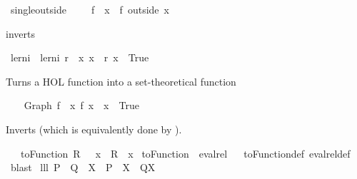 \begin{isabellebody}
\ singleoutside\ {\isacharparenleft}\ {\isachardoublequoteopen}{\isacharminus}{\isacharminus}{\isachardoublequoteclose}\ {}{}{\isacharparenright}\ \ {\isachardoublequoteopen}f\ {\isacharminus}{\isacharminus}\ x\ {\isasymequiv}\ f\ outside\ {\isacharbraceleft}x{\isacharbraceright}{\isachardoublequoteclose}%
\begin{isamarkuptext}%
 inverts %
\end{isamarkuptext}%
\isamarkuptrue%
\isamarkupfalse%
\ ler{\isacharunderscore}ni\ \ {\isachardoublequoteopen}ler{\isacharunderscore}ni\ r\ {\isacharequal}{\isacharequal}\ {\isacharparenleft}{\isasymUnion}x{\isachardot}\ {\isacharparenleft}{\isacharbraceleft}x{\isacharbraceright}\ {\isasymtimes}\ {\isacharparenleft}r\ x\ {\isacharminus}{\isacharbackquote}\ {\isacharbraceleft}True{\isacharbraceright}{\isacharparenright}{\isacharparenright}{\isacharparenright}{\isachardoublequoteclose}%
\begin{isamarkuptext}%
Turns a HOL function into a set-theoretical function%
\end{isamarkuptext}%
\isamarkuptrue%
\isamarkupfalse%
\ \ \isanewline
\ {\isachardoublequoteopen}Graph\ f\ {\isacharequal}\ {\isacharbraceleft}{\isacharparenleft}x{\isacharcomma}\ f\ x{\isacharparenright}\ {\isacharbar}\ x\ {\isachardot}\ True{\isacharbraceright}{\isachardoublequoteclose}%
\begin{isamarkuptext}%
Inverts  (which is equivalently done by ).%
\end{isamarkuptext}%
\isamarkuptrue%
\isamarkupfalse%
\ \ \ {\isachardoublequoteopen}toFunction\ R\ {\isacharequal}\ {\isacharparenleft}{\isasymlambda}\ x\ {\isachardot}\ {\isacharparenleft}R\ {\isacharcomma}{\isacharcomma}\ x{\isacharparenright}{\isacharparenright}{\isachardoublequoteclose}\isanewline
\isanewline
\isanewline
{}\isamarkupfalse%
\ {\isachardoublequoteopen}toFunction\ {\isacharequal}\ eval{\isacharunderscore}rel{\isachardoublequoteclose}%
\isadelimproof
\ %
\endisadelimproof
%
\isatagproof
{}\isamarkupfalse%
\ toFunction{\isacharunderscore}def\ eval{\isacharunderscore}rel{\isacharunderscore}def\ \isamarkupfalse%
\ blast%
\endisatagproof
{\isafoldproof}%
%
\isadelimproof
%
\endisadelimproof
\isanewline
\isanewline
{}\isamarkupfalse%
\ lll{}{}{\isacharcolon}\ {\isachardoublequoteopen}{\isacharparenleft}P\ {\isasymunion}\ Q{\isacharparenright}\ {\isacharbar}{\isacharbar}\ X\ {\isacharequal}\ {\isacharparenleft}P\ {\isacharbar}{\isacharbar}\ X{\isacharparenright}\ {\isasymunion}\ {\isacharparenleft}Q{\isacharbar}{\isacharbar}X{\isacharparenright}{\isachardoublequoteclose}%

\end{isabellebody}
